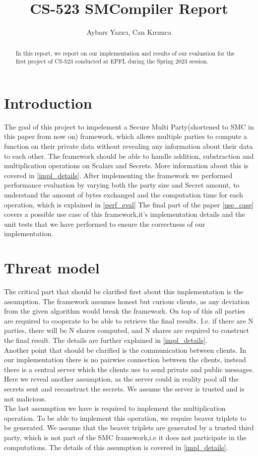 \documentclass[10pt,conference,compsocconf]{IEEEtran}
\title{CS-523 SMCompiler Report}
\author{Aybars Yazıcı, Can Kırımca}
\date{}
\begin{document}
\maketitle

\begin{abstract}
    In this report, we report on our implementation and results 
    of our evaluation for the first project of CS-523 conducted at
    EPFL during the Spring 2023 session.
\end{abstract}

\section{Introduction}
The goal of this project to impelement a Secure Multi Party(shortened to SMC in this paper from now on) 
framework, which allows multiple parties to compute a function on their private data without revealing
any information about their data to each other. The framework should be able to handle addition, substraction 
and multiplication operations on Scalars and Secrets. More information about this is covered in \ref{impl_details}. 
After implementing the framework  we performed performance evaluation by varying both the party size and Secret amount, 
to understand the amount of bytes exchanged and the computation time for each operation, which is explained in \ref{perf_eval} 
The final part of  the paper \ref{use_case} covers a possible use case of this framework,it's implementation details 
and the unit tests that we have performed to ensure the correctness of our implementation.

\section{Threat model}
The critical part that should be clarified first about this implementation is the assumption. The framework assumes 
honest but curious clients, as any deviation from the given algorithm would break the framework. On top of this all parties are 
required to cooperate to be able to retrieve the final results. I.e. if there are N parties, there will be N shares computed, 
and N shares are required to construct the final result. The details are further explained in \ref{impl_details}. 
\\
Another point that should be clarified is the communication between clients. In our implementation there is no pairwise connection
between the clients, instead there is a central server which the clients use to send private and public messages. Here we reveal another
assumption, as the server could in reality pool all the secrets sent and reconstruct the secrets. We assume the server is trusted and is
not malicious.
\\
The last assumption we have is required to implement the multiplication operation. To be able to implement this operation, we require 
beaver triplets to be generated. We assume that the beaver triplets are generated by a trusted third party, which is not part of the
SMC framework,i.e it does not participate in the computations. The details of this assumption is covered in \ref{impl_details}.
\end{document}
